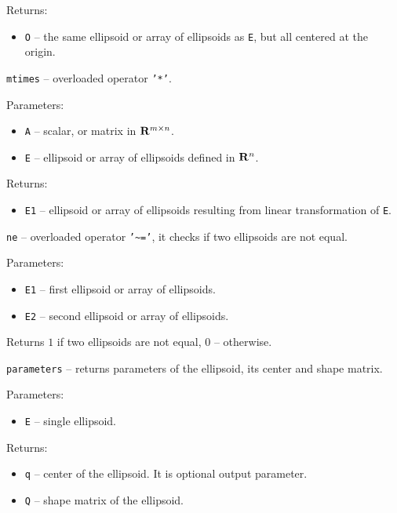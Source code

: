 Returns:
\begin{itemize}
\item {\tt O} -- the same ellipsoid or array of ellipsoids as {\tt E},
but all centered at the origin.
\end{itemize}



\newpage

{\Large {\tt mtimes}} -- overloaded operator {\tt '*'}.

Parameters:
\begin{itemize}
\item {\tt A} -- scalar, or matrix in ${\bf R}^{m\times n}$.
\item {\tt E} -- ellipsoid or array of ellipsoids defined in ${\bf R}^n$.
\end{itemize}

Returns:
\begin{itemize}
\item {\tt E1} -- ellipsoid or array of ellipsoids resulting from linear
transformation of {\tt E}.
\end{itemize}



\newpage

{\Large {\tt ne}} -- overloaded operator {\tt '\~{ }='},
it checks if two ellipsoids are not equal.

Parameters:
\begin{itemize}
\item {\tt E1} -- first ellipsoid or array of ellipsoids.
\item {\tt E2} -- second ellipsoid or array of ellipsoids.
\end{itemize}

Returns $1$ if two ellipsoids are not equal, $0$ -- otherwise.



\newpage

{\Large {\tt parameters}} -- returns parameters of the ellipsoid, its center
and shape matrix.

Parameters:
\begin{itemize}
\item {\tt E} -- single ellipsoid.
\end{itemize}

Returns:
\begin{itemize}
\item {\tt q} -- center of the ellipsoid. It is optional output parameter.
\item {\tt Q} -- shape matrix of the ellipsoid.
\end{itemize}

